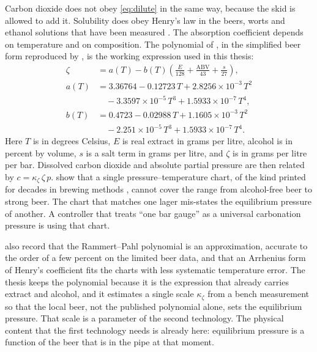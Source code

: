 Carbon dioxide does not obey \eqref{eq:dilute} in the same way, because the skid is allowed to add it. Solubility does obey Henry's law in the beers, worts and ethanol solutions that have been measured \citep{findlay1911,speers2013,weiss1974,carroll1991}. The absorption coefficient depends on temperature and on composition. The polynomial of \citet{rammert1991}, in the simplified beer form reproduced by \citet{speers2013}, is the working expression used in this thesis:
\begin{align}
\label{eq:zeta}
\zeta
&=
a(T) - b(T)\left(\frac{E}{128} + \frac{\mathrm{ABV}}{43} + \frac{s}{27}\right),
\\
a(T)
&=
3.36764 - 0.12723\,T + 2.8256\times 10^{-3}\,T^{2}
\nonumber\\
&\quad
- 3.3597\times 10^{-5}\,T^{3} + 1.5933\times 10^{-7}\,T^{4},
\nonumber\\
b(T)
&=
0.4723 - 0.02988\,T + 1.1605\times 10^{-3}\,T^{2}
\nonumber\\
&\quad
- 2.251\times 10^{-5}\,T^{3} + 1.5933\times 10^{-7}\,T^{4}.
\end{align}
Here $T$ is in degrees Celsius, $E$ is real extract in grams per litre, alcohol is in percent by volume, $s$ is a salt term in grams per litre, and $\zeta$ is in grams per litre per bar. Dissolved carbon dioxide and absolute partial pressure are then related by $c = \kappa_{\zeta}\,\zeta\,p$. \citet{speers2013} show that a single pressure--temperature chart, of the kind printed for decades in brewing methods \citep{asbc2014}, cannot cover the range from alcohol-free beer to strong beer. The chart that matches one lager mis-states the equilibrium pressure of another. A controller that treats ``one bar gauge'' as a universal carbonation pressure is using that chart.

\citet{speers2013} also record that the Rammert--Pahl polynomial is an approximation, accurate to the order of a few percent on the limited beer data, and that an Arrhenius form of Henry's coefficient fits the charts with less systematic temperature error. The thesis keeps the polynomial because it is the expression that already carries extract and alcohol, and it estimates a single scale $\kappa_{\zeta}$ from a bench measurement so that the local beer, not the published polynomial alone, sets the equilibrium pressure. That scale is a parameter of the second technology. The physical content that the first technology needs is already here: equilibrium pressure is a function of the beer that is in the pipe at that moment.

